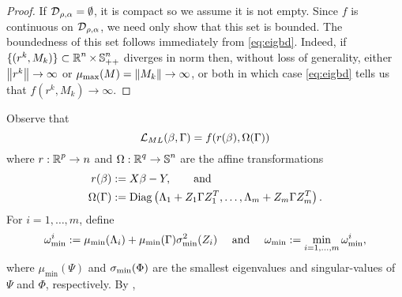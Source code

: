 \begin{proof}
If $\operatorname{\mathcal{D}}_{\rho,\alpha}=\emptyset$, it is compact so we assume it is not empty.
Since $f$ is continuous on $\operatorname{\mathcal{D}}_{\rho,\alpha}$, we need only show that this set 
is bounded. The boundedness of this set follows immediately from \eqref{eq:eigbd}. Indeed, if
$\{(r^k,M_k)\}\subset \operatorname{\mathbb{R}}^n\times \operatorname{\mathbb{S}}_{++}^n$ 
diverges in norm then,  
without loss of generality, either $\left\Vert r^k\right\Vert\rightarrow \infty$
or $\mu_{\text{max}}(M)=\left\Vert M_k\right\Vert\rightarrow\infty$, or both in which case 
\eqref{eq:eigbd} tells us that $f(r^k,M_k)\rightarrow\infty$.
\end{proof}
Observe that
\[
\LL_{ML}(\beta,\Gam)=f( r(\beta), \Omega(\Gam)) %
\]
where $r:\operatorname{\mathbb{R}}^p\rightarrow n$ and
$\Omega:\operatorname{\mathbb{R}}^q\rightarrow \operatorname{\mathbb{S}}^n$ are the affine transformations
\[\begin{aligned}
 r(\beta)&:=X\beta-Y,\qquad\text{and}
\\
\Omega(\Gamma)&:=
\mathrm{Diag}\left(\Lambda_1+Z_1\Gamma Z_1^T,\dots,
\Lambda_m+Z_m\Gamma Z_m^T\right).
\end{aligned}\]
For 
$i=1,\dots,m$, define
\[
\omega^i_\mmin:=
\mu_{\text{min}}(\Lambda_i)+\mu_\mmin(\Gam) %
\sig^2_{\text{min}}(Z_i)\quad \mbox{ and }
\quad
\omega_\mmin:=
\min_{i=1,\dots,m}\omega^i_\mmin,
\]
where $\mu_{\text{min}}(\Psi)$ 
and $\sigma_{\text{min}}(\Phi)$ 
are the smallest eigenvalues and singular-values of 
$\Psi$ and $\Phi$,
respectively. 
By \cite[Theorem 3.1]{ABBP2021},




